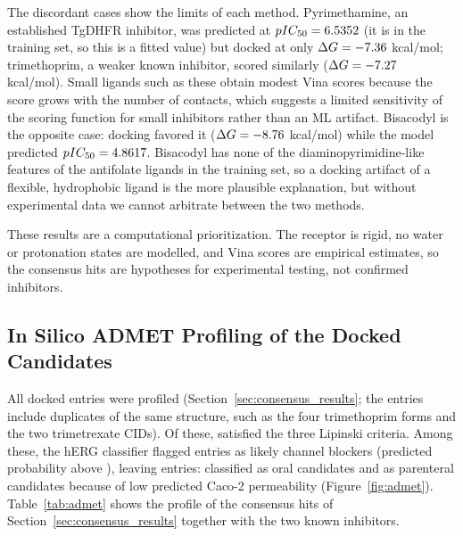 The discordant cases show the limits of each method. Pyrimethamine, an established TgDHFR inhibitor, was predicted at $pIC_{50} = 6.5352$ (it is in the training set, so this is a fitted value) but docked at only $\Delta G = -7.36$ kcal/mol; trimethoprim, a weaker known inhibitor, scored similarly ($\Delta G = -7.27$ kcal/mol). Small ligands such as these obtain modest Vina scores because the score grows with the number of contacts, which suggests a limited sensitivity of the scoring function for small inhibitors rather than an ML artifact. Bisacodyl is the opposite case: docking favored it ($\Delta G = -8.76$ kcal/mol) while the model predicted $pIC_{50} = 4.8617$. Bisacodyl has none of the diaminopyrimidine-like features of the antifolate ligands in the training set, so a docking artifact of a flexible, hydrophobic ligand is the more plausible explanation, but without experimental data we cannot arbitrate between the two methods.

These results are a computational prioritization. The receptor is rigid, no water or protonation states are modelled, and Vina scores are empirical estimates, so the consensus hits are hypotheses for experimental testing, not confirmed inhibitors.

\subsection{In Silico ADMET Profiling of the Docked Candidates}
\label{sec:admet_results}

All \AdmetNDocked{} docked entries were profiled (Section~\ref{sec:consensus_results}; the entries include duplicates of the same structure, such as the four trimethoprim forms and the two trimetrexate CIDs). Of these, \AdmetNLipinski{} satisfied the three Lipinski criteria. Among these, the hERG classifier flagged \AdmetNHergFlagged{} entries as likely channel blockers (predicted probability above \AdmetHergThresh), leaving \AdmetNRemaining{} entries: \AdmetNOral{} classified as oral candidates and \AdmetNParenteral{} as parenteral candidates because of low predicted Caco-2 permeability (Figure~\ref{fig:admet}). Table~\ref{tab:admet} shows the profile of the consensus hits of Section~\ref{sec:consensus_results} together with the two known inhibitors.

\begin{table}[htbp]
	\centering
	\caption{Predicted ADMET profile of the \AdmetNConsensus{} consensus hits and of the known inhibitors pyrimethamine and trimethoprim. Structures that appear under several entries are listed once. hERG prob. is the predicted probability of channel blockade (flag above \AdmetHergThresh) and Caco-2 $\log P_{app}$ the predicted permeability (oral if above \AdmetCacoThresh).}
	\label{tab:admet}
	
\end{table}

